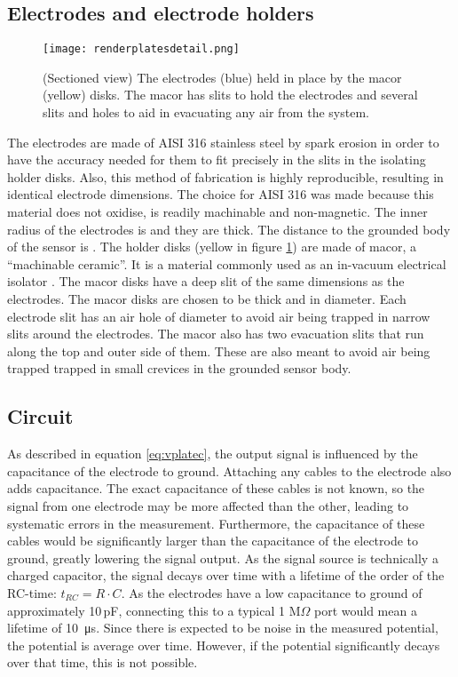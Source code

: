 \subsection{Electrodes and electrode holders}

\begin{figure}[H]
 \centering
 \texttt{[image: renderplatesdetail.png]}
 \caption{(Sectioned view) The electrodes (blue) held in place by the macor (yellow) disks. The macor has slits to hold the electrodes and several slits and holes to aid in evacuating any air from the system.}
 \label{fig:plates}
\end{figure}

The electrodes are made of AISI 316 stainless steel by spark erosion in order to have the accuracy needed for them to fit precisely in the slits in the isolating holder disks. Also, this method of fabrication is highly reproducible, resulting in identical electrode dimensions. The choice for AISI 316 was made because this material does not oxidise, is readily machinable and non-magnetic. 
The inner radius of the electrodes is  and they are  thick. The distance to the grounded body of the sensor is .
The holder disks (yellow in figure \ref{fig:plates}) are made of macor, a ``machinable ceramic''. It is a material commonly used as an in-vacuum electrical isolator . The macor disks have a  deep slit of the same dimensions as the electrodes. The macor disks are chosen to be  thick and  in diameter. Each electrode slit has an air hole of  diameter to avoid air being trapped in narrow slits around the electrodes. The macor also has two evacuation slits that run along the top and outer side of them. These are also meant to avoid air being trapped trapped in small crevices in the grounded sensor body.

\subsection{Circuit}
\label{sec:design/circuit}
As described in equation \ref{eq:vplatec}, the output signal is influenced by the capacitance of the electrode to ground. Attaching any cables to the electrode also adds capacitance. The exact capacitance of these cables is not known, so the signal from one electrode may be more affected than the other, leading to systematic errors in the measurement.
Furthermore, the capacitance of these cables would be significantly larger than the capacitance of the electrode to ground, greatly lowering the signal output.
As the signal source is technically a charged capacitor, the signal decays over time with a lifetime of the order of the RC-time: $t_{RC} = R\cdot C$. As the electrodes have a low capacitance to ground of approximately 10\,pF, connecting this to a typical 1 M$\Omega$ port would mean a lifetime of \SI{10}{\micro\second}. Since there is expected to be noise in the measured potential, the potential is average over time. However, if the potential significantly decays over that time, this is not possible.

